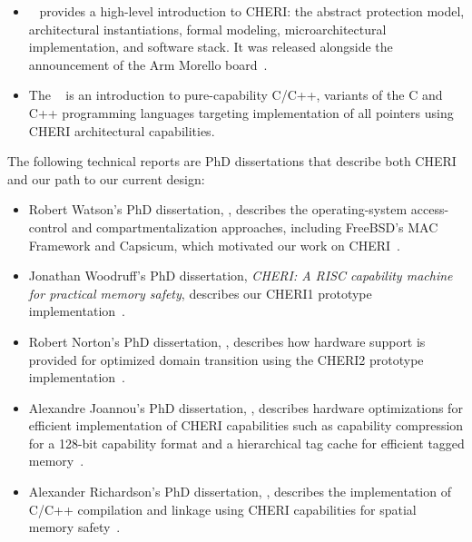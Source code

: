 \begin{itemize}
\item {}~\cite{UCAM-CL-TR-941} provides a
  high-level introduction to CHERI: the abstract protection model,
  architectural instantiations, formal modeling, microarchitectural
  implementation, and software stack.
  It was released alongside the announcement of the Arm Morello
  board~\cite{arm-morello}.

\item The ~\cite{UCAM-CL-TR-947} is an
  introduction to pure-capability C/C++, variants of the C and C++ programming
  languages targeting implementation of all pointers using CHERI architectural
  capabilities.
\end{itemize}

The following technical reports are PhD dissertations that describe both CHERI
and our path to our current design:

\begin{itemize}
\item Robert Watson's PhD dissertation, ,
  describes the operating-system
  access-control and compartmentalization approaches, including FreeBSD's
  MAC Framework and Capsicum,
  which motivated our work on CHERI~\cite{Watson10a,UCAM-CL-TR-818}.

\item Jonathan Woodruff's PhD dissertation, \textit{CHERI: A RISC capability
  machine for practical memory safety}, describes our CHERI1 prototype
  implementation~\cite{UCAM-CL-TR-858}.

\item Robert Norton's PhD dissertation, ,
  describes how hardware support is provided for
  optimized domain transition using the CHERI2 prototype
  implementation~\cite{UCAM-CL-TR-887}.

\item Alexandre Joannou's PhD dissertation, ,
  describes hardware
  optimizations for efficient implementation of CHERI capabilities such as
  capability compression for a 128-bit capability format and a hierarchical tag
  cache for efficient tagged memory~\cite{UCAM-CL-TR-936}.

\item Alexander Richardson's PhD dissertation, ,
  describes the implementation
  of C/C++ compilation and linkage using CHERI capabilities for spatial memory
  safety~\cite{UCAM-CL-TR-949}.
\end{itemize}


